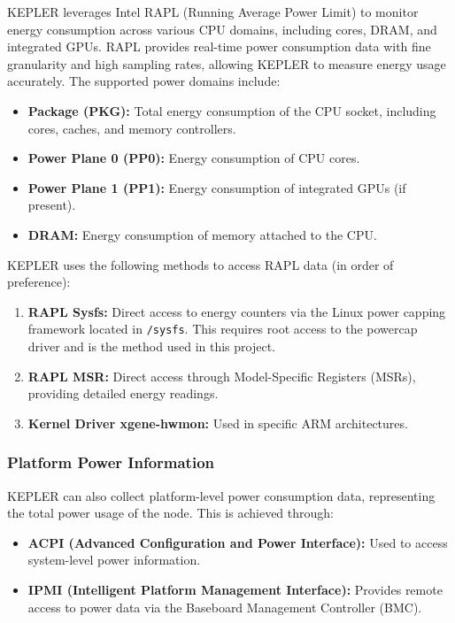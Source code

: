 KEPLER leverages Intel RAPL (Running Average Power Limit) to monitor energy consumption across various CPU domains, including cores, DRAM, and integrated GPUs. RAPL provides real-time power consumption data with fine granularity and high sampling rates, allowing KEPLER to measure energy usage accurately. The supported power domains include:
\begin{itemize}
\item \textbf{Package (PKG):} Total energy consumption of the CPU socket, including cores, caches, and memory controllers.
\item \textbf{Power Plane 0 (PP0):} Energy consumption of CPU cores.
\item \textbf{Power Plane 1 (PP1):} Energy consumption of integrated GPUs (if present).
\item \textbf{DRAM:} Energy consumption of memory attached to the CPU.
\end{itemize}
KEPLER uses the following methods to access RAPL data (in order of preference):
\begin{enumerate}
\item \textbf{RAPL Sysfs:} Direct access to energy counters via the Linux power capping framework located in \texttt{/sysfs}. This requires root access to the powercap driver and is the method used in this project.
\item \textbf{RAPL MSR:} Direct access through Model-Specific Registers (MSRs), providing detailed energy readings.
\item \textbf{Kernel Driver xgene-hwmon:} Used in specific ARM architectures.
\end{enumerate}

\subsubsection{Platform Power Information}

KEPLER can also collect platform-level power consumption data, representing the total power usage of the node. This is achieved through:

\begin{itemize}
\item \textbf{ACPI (Advanced Configuration and Power Interface):} Used to access system-level power information.
\item \textbf{IPMI (Intelligent Platform Management Interface):} Provides remote access to power data via the Baseboard Management Controller (BMC).
\end{itemize}

